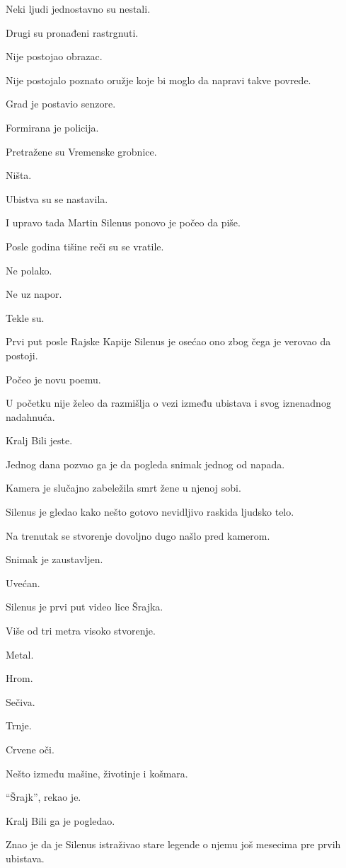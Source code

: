 Neki ljudi jednostavno su nestali.

Drugi su pronađeni rastrgnuti.

Nije postojao obrazac.

Nije postojalo poznato oružje koje bi moglo da napravi takve povrede.

Grad je postavio senzore.

Formirana je policija.

Pretražene su Vremenske grobnice.

Ništa.

Ubistva su se nastavila.

I upravo tada Martin Silenus ponovo je počeo da piše.

Posle godina tišine reči su se vratile.

Ne polako.

Ne uz napor.

Tekle su.

Prvi put posle Rajske Kapije Silenus je osećao ono zbog čega je verovao da postoji.

Počeo je novu poemu.

U početku nije želeo da razmišlja o vezi između ubistava i svog iznenadnog nadahnuća.

Kralj Bili jeste.

Jednog dana pozvao ga je da pogleda snimak jednog od napada.

Kamera je slučajno zabeležila smrt žene u njenoj sobi.

Silenus je gledao kako nešto gotovo nevidljivo raskida ljudsko telo.

Na trenutak se stvorenje dovoljno dugo našlo pred kamerom.

Snimak je zaustavljen.

Uvećan.

Silenus je prvi put video lice Šrajka.

Više od tri metra visoko stvorenje.

Metal.

Hrom.

Sečiva.

Trnje.

Crvene oči.

Nešto između mašine, životinje i košmara.

``Šrajk'', rekao je.

Kralj Bili ga je pogledao.

Znao je da je Silenus istraživao stare legende o njemu još mesecima pre prvih ubistava.

